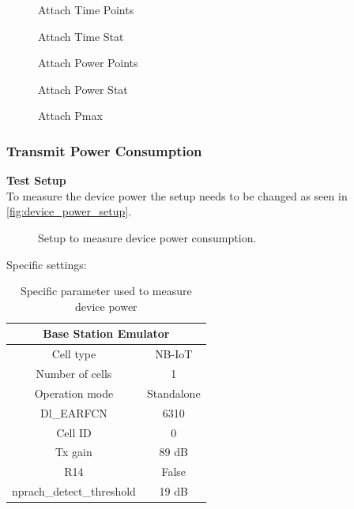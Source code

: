 \begin{figure}[H]
\centering
\resizebox{\textwidth}{!}{
}
\caption{Attach Time Points}
\label{fig:device_power_setup}
\end{figure}

\begin{figure}[H]
\centering
\resizebox{\textwidth}{!}{
}
\caption{Attach Time Stat}
\label{fig:device_power_setup}
\end{figure}

\begin{figure}[H]
\centering
\resizebox{\textwidth}{!}{
}
\caption{Attach Power Points}
\label{fig:device_power_setup}
\end{figure}

\begin{figure}[H]
\centering
\resizebox{\textwidth}{!}{
}
\caption{Attach Power Stat}
\label{fig:device_power_setup}
\end{figure}

\begin{figure}[H]
\centering
\resizebox{\textwidth}{!}{
}
\caption{Attach Pmax}
\label{fig:device_power_setup}
\end{figure}

\subsubsection{Transmit Power Consumption}
\textbf{Test Setup}\\
To measure the device power the setup needs to be changed as seen in \autoref{fig:device_power_setup}.
\begin{figure}[H]
\centering
{}
\caption{Setup to measure device power consumption.}
\label{fig:device_power_setup}
\end{figure}

Specific settings:
\begin{table}[H]
\centering
\begin{tabular}{|c|c|} \hline
\multicolumn{2}{|c|}{\textbf{Base Station Emulator}} \\ \hline
Cell type          & NB-IoT         \\ \hline
Number of cells    & 1              \\ \hline
Operation mode     & Standalone     \\ \hline
Dl\_EARFCN         & 6310           \\ \hline
Cell ID            & 0              \\ \hline
Tx gain            & 89 dB          \\ \hline
R14                & False          \\ \hline
nprach\_detect\_threshold  & 19 dB  \\ \hline
\end{tabular}
\caption{Specific parameter used to measure device power}
\label{tab:device_power_settings}
\end{table}



